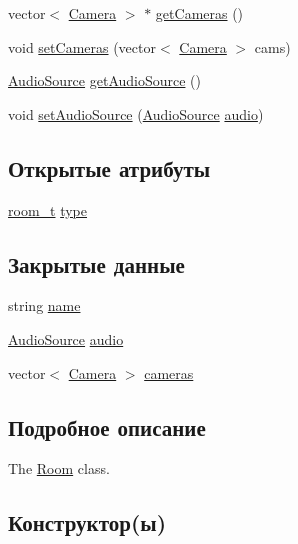 \begin{DoxyCompactItemize}
\item 
vector$<$ \hyperlink{struct_camera}{Camera} $>$ $\ast$ \hyperlink{class_room_a4a67443ce377dda8f71d862428a31ef1}{get\+Cameras} ()
\item 
void \hyperlink{class_room_ae105a370ebb1cdded2254d39c547a5fd}{set\+Cameras} (vector$<$ \hyperlink{struct_camera}{Camera} $>$ cams)
\item 
\hyperlink{struct_audio_source}{Audio\+Source} \hyperlink{class_room_ad99b6c39b3322dc0f28ce31c35402bb9}{get\+Audio\+Source} ()
\item 
void \hyperlink{class_room_ae51a48335bf154e1194c1acc2fa16813}{set\+Audio\+Source} (\hyperlink{struct_audio_source}{Audio\+Source} \hyperlink{class_room_a09874479cea41dde79c7c8dfdbd1703c}{audio})
\end{DoxyCompactItemize}
\subsection*{Открытые атрибуты}
\begin{DoxyCompactItemize}
\item 
\hyperlink{_operator_2_grid_2include_2room_8h_aba46c5e77984ba564800a07427f8eeb1}{room\+\_\+t} \hyperlink{class_room_a9b8b36d17943edd1d8085bb5c2d8dbbf}{type}
\end{DoxyCompactItemize}
\subsection*{Закрытые данные}
\begin{DoxyCompactItemize}
\item 
string \hyperlink{class_room_ae75204d685fe893bf4c867f9f3a79eb3}{name}
\item 
\hyperlink{struct_audio_source}{Audio\+Source} \hyperlink{class_room_a09874479cea41dde79c7c8dfdbd1703c}{audio}
\item 
vector$<$ \hyperlink{struct_camera}{Camera} $>$ \hyperlink{class_room_a3e2ec3339b74eccacc2946d42151efc1}{cameras}
\end{DoxyCompactItemize}


\subsection{Подробное описание}
The \hyperlink{class_room}{Room} class. 

\subsection{Конструктор(ы)}
\mbox{\label{class_room_a545e0b1d59ba66d72691c0dec993d9f0}} 
